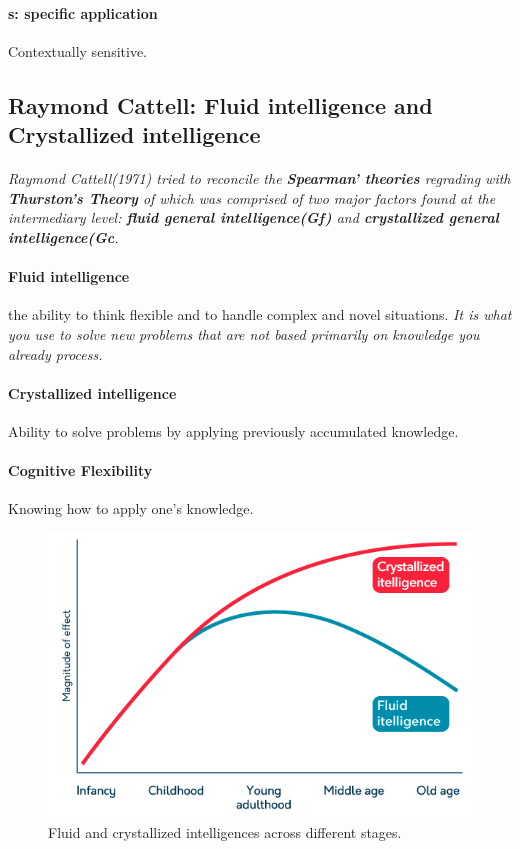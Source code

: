 \documentclass{article}
\begin{document}
	\paragraph{s: specific application} Contextually sensitive.
	\subsection{Raymond Cattell: Fluid intelligence and Crystallized intelligence}
	\paragraph{} \emph{Raymond Cattell(1971) tried to reconcile the \textbf{Spearman' theories} regrading  with \textbf{Thurston's Theory} of  which was comprised of two major factors found at the intermediary level: \textbf{fluid general intelligence(Gf)} and \textbf{crystallized general intelligence(Gc}.}
	\paragraph{Fluid intelligence} the ability to think flexible and to handle complex and novel situations. \emph{It is what you use to solve new problems that are not based primarily on knowledge you already process.}
	\paragraph{Crystallized intelligence} Ability to solve problems by applying previously accumulated knowledge.
	\paragraph{Cognitive Flexibility} Knowing how to apply one's knowledge.
	\begin{figure}[H]
		\centering
		\includegraphics[width = \linewidth]{pic/fluid_and_crystallized_intelligences_over_ages}
		\caption{Fluid and crystallized intelligences across different stages.}	
	\end{figure}
\end{document}
